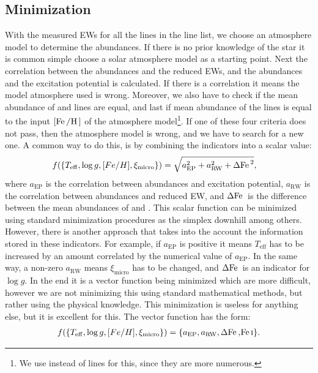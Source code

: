 \subsection{Minimization}

With the measured EWs for all the lines in the line list, we choose an
atmosphere model to determine the abundances. If there is no prior knowledge of
the star it is common simple choose a solar atmosphere model as a starting
point. Next the correlation between the abundances and the reduced EWs, and the
abundances and the excitation potential is calculated. If there is a correlation
it means the model atmosphere used is wrong. Moreover, we also have to check if
the mean abundance of  and  lines are equal, and last if
mean abundance of the  lines is equal to the input
$[\ion{Fe}/\ion{H}]$ of the atmosphere model\footnote{We use  instead
of  lines for this, since they are more numerous.}. If one of these
four criteria does not pass, then the atmosphere model is wrong, and we have to
search for a new one. A common way to do this, is by combining the indicators
into a scalar value:
\begin{align}
  f(\{T_\mathrm{eff}, \log g, [Fe/H], \xi_\mathrm{micro}\}) &= \sqrt{a_\mathrm{EP}^2 + a_\mathrm{RW}^2 + \Delta\ion{Fe}{}^2},
\end{align}
where $a_\mathrm{EP}$ is the correlation between abundances and excitation
potential, $a_\mathrm{RW}$ is the correlation between abundances and reduced EW,
and $\Delta\ion{Fe}{}$ is the difference between the mean abundances of
 and . This scalar function can be minimized using
standard minimization procedures as the simplex downhill among others. However,
there is another approach that takes into the account the information stored in
these indicators. For example, if $a_\mathrm{EP}$ is positive it means
$T_\mathrm{eff}$ has to be increased by an amount correlated by the numerical
value of $a_\mathrm{EP}$. In the same way, a non-zero $a_\mathrm{RW}$ means
$\xi_\mathrm{micro}$ has to be changed, and $\Delta\ion{Fe}{}$ is an indicator
for $\log g$. In the end it is a vector function being minimized which are more
difficult, however we are not minimizing this using standard mathematical
methods, but rather using the physical knowledge. This minimization is useless
for anything else, but it is excellent for this.
The vector function has the form:
\begin{align}
    f(\{T_\mathrm{eff}, \log g, [Fe/H], \xi_\mathrm{micro}\}) = \{a_\mathrm{EP}, a_\mathrm{RW}, \Delta\ion{Fe}, \ion{Fe}{I}\}.
\end{align}

